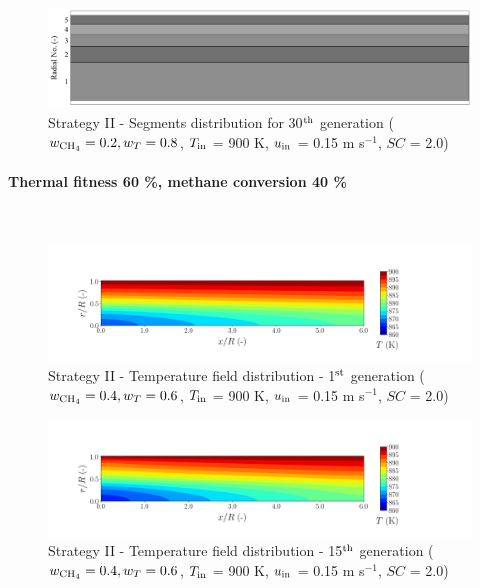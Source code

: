 \documentclass[preprint,12pt]{elsarticle}
\begin{document}
\begin{figure}[h!]
\centering
\includegraphics[width=120mm]{results/segments/5segEq/20C80T/seg.png}
\caption{\label{fig:30L6040G1-TField} Strategy II - Segments distribution for 30$^{\rm{th}}$ generation ($w_{\rm{CH_4}} = 0.2, w_T = 0.8$, $T_{\rm{in}}$ = 900 K, $u_{\rm{in}}$ = 0.15 m s$^{-1}$, $SC$ = 2.0)}
\end{figure}




\clearpage



\paragraph{Thermal fitness 60 \%, methane conversion 40 \%} \hspace{0pt} \\
\noindent 


\begin{figure}[h!]
\centering
\includegraphics[width=190mm]{results/5Eq/40C_60T/GEN1-TFIELD.png}
\caption{\label{fig:5RES4060G1-TField} Strategy II - Temperature field distribution - 1$^{\rm{st}}$ generation ($w_{\rm{CH_4}} = 0.4, w_T = 0.6$, $T_{\rm{in}}$ = 900 K, $u_{\rm{in}}$ = 0.15 m s$^{-1}$, $SC$ = 2.0)}
\end{figure}

\begin{figure}[h!]
\centering
\includegraphics[width=190mm]{results/5Eq/40C_60T/GEN15-TFIELD.png}
\caption{\label{fig:5RES4060G15-TField} Strategy II - Temperature field distribution - 15$^{\rm{th}}$ generation ($w_{\rm{CH_4}} = 0.4, w_T = 0.6$, $T_{\rm{in}}$ = 900 K, $u_{\rm{in}}$ = 0.15 m s$^{-1}$, $SC$ = 2.0)}
\end{figure}
\end{document}
